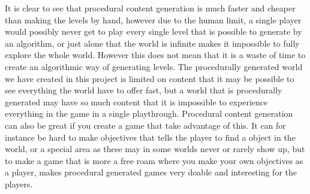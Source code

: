 It is clear to see that procedural content generation is much faster and cheaper than making the levels by hand, however due to the human limit, a single player would possibly never get to play every single level that is possible to generate by an algorithm, or just alone that the world is infinite makes it impossible to fully explore the whole world. However this does not mean that it is a waste of time to create an algorithmic way of generating levels. The procedurally generated world we have created in this project is limited on content that it may be possible to see everything the world have to offer fast, but a world that is procedurally generated may have so much content that it is impossible to experience everything in the game in a single playthrough. Procedural content generation can also be great if you create a game that take advantage of this. It can for instance be hard to make objectives that tells the player to find a object in the world, or a special area as these may in some worlds never or rarely show up, but to make a game that is more a free roam where you make your own objectives as a player, makes procedural generated games very doable and interesting for the players.